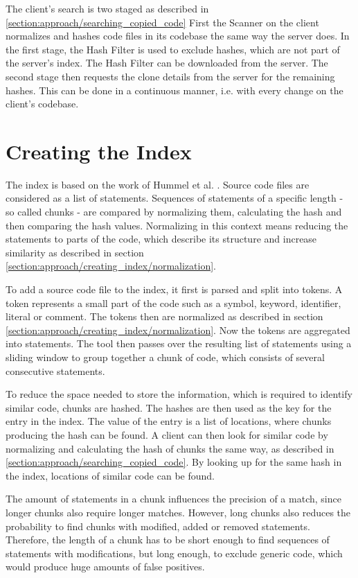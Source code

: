 The client's search is two staged as described in \autoref{section:approach/searching_copied_code}
First the Scanner on the client normalizes and hashes code files in its codebase the same way the server does.
In the first stage, the Hash Filter is used to exclude hashes, which are not part of the server's index.
The Hash Filter can be downloaded from the server.
The second stage then requests the clone details from the server for the remaining hashes.
This can be done in a continuous manner, i.e. with every change on the client's codebase.

\section{Creating the Index}\label{section:approach/creating_index}
The index is based on the work of Hummel et al. \cite{hummel2010index}.
Source code files are considered as a list of statements.
Sequences of statements of a specific length - so called chunks - are compared by normalizing them, calculating the hash and then comparing the hash values.
Normalizing in this context means reducing the statements to parts of the code, which describe its structure and increase similarity as described in section \ref{section:approach/creating_index/normalization}.

To add a source code file to the index, it first is parsed and split into tokens.
A token represents a small part of the code such as a symbol, keyword, identifier, literal or comment.
The tokens then are normalized as described in section \ref{section:approach/creating_index/normalization}.
Now the tokens are aggregated into statements.
The tool then passes over the resulting list of statements using a sliding window to group together a chunk of code, which consists of several consecutive statements. 

To reduce the space needed to store the information, which is required to identify similar code, chunks are hashed.
The hashes are then used as the key for the entry in the index.
The value of the entry is a list of locations, where chunks producing the hash can be found.
A client can then look for similar code by normalizing and calculating the hash of chunks the same way, as described in \autoref{section:approach/searching_copied_code}.
By looking up for the same hash in the index, locations of similar code can be found.

The amount of statements in a chunk influences the precision of a match, since longer chunks also require longer matches.
However, long chunks also reduces the probability to find chunks with modified, added or removed statements.
Therefore, the length of a chunk has to be short enough to find sequences of statements with modifications, but long enough, to exclude generic code, which would produce huge amounts of false positives.

